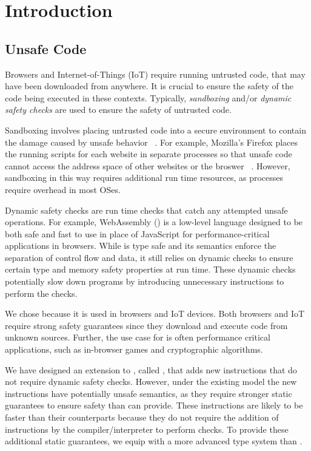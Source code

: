 \chapter{Introduction}
\label{chp:intro}

\section{Unsafe Code}
Browsers and Internet-of-Things (IoT) require running untrusted code, that may have been downloaded from anywhere.
It is crucial to ensure the safety of the code being executed in these contexts.
Typically, \emph{sandboxing} and/or \emph{dynamic safety checks} are used to ensure the safety of untrusted code.

Sandboxing involves placing untrusted code into a secure environment to contain the damage caused by unsafe behavior ~\cite{sandboxes}.
For example, Mozilla's Firefox places the running scripts for each website in separate processes so that unsafe code cannot access the address space of other websites or the broswer ~\cite{foxbox}.
However, sandboxing in this way requires additional run time resources, as processes require overhead in most OSes.

Dynamic safety checks are run time checks that catch any attempted unsafe operations.
For example, WebAssembly (\wasm) is a low-level language designed to be both safe and fast to use in place of JavaScript for performance-critical applications in browsers.
While \wasm is type safe and its semantics enforce the separation of control flow and data, it still relies on dynamic checks to ensure certain type and memory safety properties at run time.
These dynamic checks potentially slow down programs by introducing unnecessary instructions to perform the checks.

We chose \wasm because it is used in browsers and IoT devices.
Both browsers and IoT require strong safety guarantees since they download and execute code from unknown sources.
Further, the use case for \wasm is often performance critical applications, such as in-browser games and cryptographic algorithms.

We have designed an extension to \wasm, called \name, that adds new instructions that do not require dynamic safety checks.
However, under the existing \wasm model the new \name instructions have potentially unsafe semantics, as they require stronger static guarantees to ensure safety than \wasm can provide.
These instructions are likely to be faster than their \wasm counterparts because they do not require the addition of instructions by the compiler/interpreter to perform checks.
To provide these additional static guarantees, we equip \name with a more advanced type system than \wasm.

